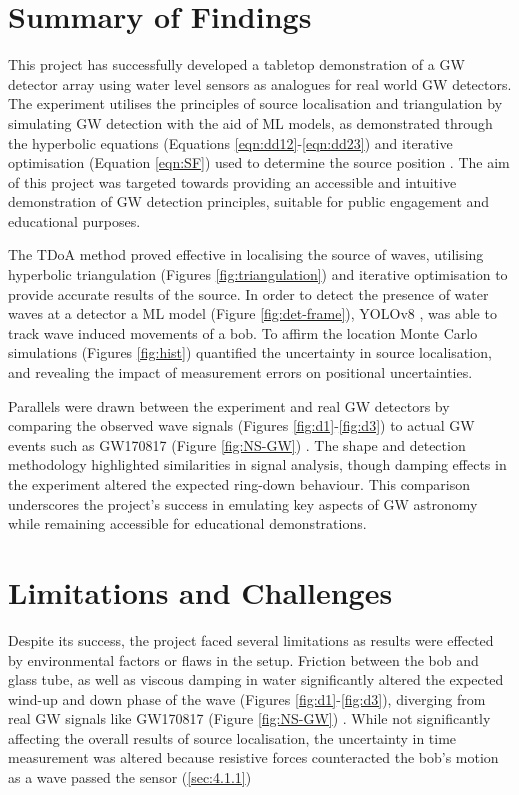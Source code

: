 \section{Summary of Findings}
This project has successfully developed a tabletop demonstration of a GW detector array using water level sensors as analogues for real world GW detectors. The experiment utilises the principles of source localisation and triangulation by simulating GW detection with the aid of ML models, as demonstrated through the hyperbolic equations (Equations \ref{eqn:dd12}-\ref{eqn:dd23}) and iterative optimisation (Equation \ref{eqn:SF}) used to determine the source position \cite{boxer_2025_15041819}. The aim of this project was targeted towards providing an accessible and intuitive demonstration of GW detection principles, suitable for public engagement and educational purposes.

The TDoA method proved effective in localising the source of waves, utilising hyperbolic triangulation (Figures \ref{fig:triangulation}) and iterative optimisation to provide accurate results of the source. In order to detect the presence of water waves at a detector a ML model (Figure \ref{fig:det-frame}), YOLOv8 \cite{ultralytics_yolov8_nodate}, was able to track wave induced movements of a bob. To affirm the location Monte Carlo simulations (Figures \ref{fig:hist}) quantified the uncertainty in source localisation, and revealing the impact of measurement errors on positional uncertainties. 

Parallels were drawn between the experiment and real GW detectors by comparing the observed wave signals (Figures \ref{fig:d1}-\ref{fig:d3}) to actual GW events such as GW170817 (Figure \ref{fig:NS-GW}) \cite{Abbott_2017}. The shape and detection methodology highlighted similarities in signal analysis, though damping effects in the experiment altered the expected ring-down behaviour. This comparison underscores the project's success in emulating key aspects of GW astronomy while remaining accessible for educational demonstrations.

\section{Limitations and Challenges}
Despite its success, the project faced several limitations as results were effected by environmental factors or flaws in the setup. Friction between the bob and glass tube, as well as viscous damping in water significantly altered the expected wind-up and down phase of the wave (Figures \ref{fig:d1}-\ref{fig:d3}), diverging from real GW signals like GW170817 (Figure \ref{fig:NS-GW}) \cite{Abbott_2017}. While not significantly affecting the overall results of source localisation, the uncertainty in time measurement was altered because resistive forces counteracted the bob's motion as a wave passed the sensor (\ref{sec:4.1.1})

